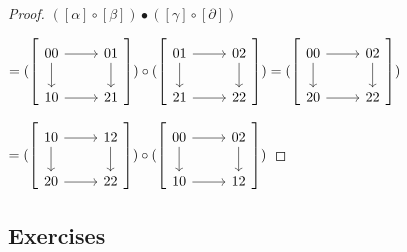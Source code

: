 \begin{proof}
    $([\alpha] \circ [\beta]) \bullet ( [\gamma] \circ [\partial])$
    
     $=( \left[
    \begin{tikzcd}
        00
        \rar
        \dar
        &
        01
        \dar
        \\
        10
        \rar
        &
        21
    \end{tikzcd}
    \right] ) 
    \circ ( \left[ 
    \begin{tikzcd}
        01
        \rar
        \dar
        &
        02
        \dar
        \\
        21 
        \rar
        &
        22
    \end{tikzcd}
    \right] )
    =
    ( \left[
    \begin{tikzcd}
        00
        \rar
        \dar
        &
        02
        \dar
        \\
        20
        \rar
        &
        22
    \end{tikzcd}
    \right] )$ 

    
    $=
    ( \left[
    \begin{tikzcd}
        10
        \rar
        \dar
        &
        12
        \dar
        \\
        20
        \rar
        &
        22
    \end{tikzcd}
    \right] ) \circ
    ( \left[
    \begin{tikzcd}
        00
        \rar
        \dar
        &
        02
        \dar
        \\
        10
        \rar
        &
        12
    \end{tikzcd}
    \right] ) 
$
\end{proof}

\subsection{Exercises}

